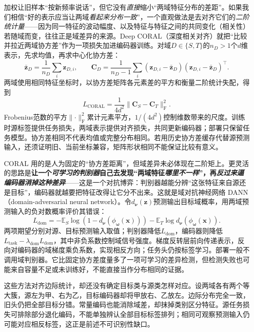 加权让旧样本“按新频率说话”，但它没有\emph{直接}缩小“两域特征分布的差距”。如果我们相信“好的表示应当让两域\emph{看起来分布一致}”，一个直观做法是去对齐它们的\emph{二阶统计量}——因为同一特征的波动幅度、以及特征与特征之间的共同变化（相关性）若随域而变，往往正是域差异的来源。Deep CORAL（深度相关对齐）就把“比较并拉近两域协方差”作为一项损失加进编码器训练。对域$D\in\{S,T\}$的$n_D>1$个$d$维表示，先求均值，再求中心化协方差：
\[
\bar{\bm z}_D=\frac1{n_D}\sum_i\bm z_{D,i},\qquad
\bm C_D=\frac1{n_D-1}\sum_i
(\bm z_{D,i}-\bar{\bm z}_D)(\bm z_{D,i}-\bar{\bm z}_D)^\top.
\]
两域使用相同特征坐标时，以协方差矩阵各元素差的平方和衡量二阶统计失配，得到
\begin{equation}
L_{\mathrm{CORAL}}=\frac1{4d^2}\lVert\bm C_S-\bm C_T\rVert_{\mathrm F}^2.
\label{eq:ket-update-coral}
\end{equation}
Frobenius范数的平方$\lVert\cdot\rVert_{\mathrm F}^2$累计元素平方，$1/(4d^2)$控制维数带来的尺度。训练时源标签提供任务损失，两域表示提供对齐损失，共同更新编码器；部署只保留任务模型。协方差相同不代表均值或完整分布相同。若用历史协方差缓存代替源预测输入，还须证明旧、当前坐标兼容，矩阵形状相同不能保证比较有意义。

CORAL 用的是人为固定的“协方差距离”，但域差异未必体现在二阶矩上。更灵活的思路是\textbf{让一个\emph{可学习的判别器}自己去发现“两域特征\emph{哪里不一样}”，再\emph{反过来逼编码器消掉这种差异}}——这是一个对抗博弈：判别器越能分辨“这张特征来自源还是目标”，编码器就越要把特征改得让它分不出来。这就是域对抗神经网络 DANN（domain-adversarial neural network）。令$d_{\bm{\nu}}(\bm z)$预测输出目标域概率，用两域预测输入的负对数概率评价其错误：
\[
L_{\mathrm{dom}}
=-\mathbb E_S\log(1-d_{\bm{\nu}}(\phi_{\bm{\omega}}(\bm x)))
 -\mathbb E_T\log d_{\bm{\nu}}(\phi_{\bm{\omega}}(\bm x)).
\]
两项期望分别对源、目标预测输入取值；判别器降低$L_{\mathrm{dom}}$，编码器则降低$L_{\mathrm{task}}-\lambda_{\mathrm{dom}}L_{\mathrm{dom}}$，其中非负系数控制域信号强度。梯度反转层前向传递表示，反向对编码器的域梯度乘负系数，实现相反方向；任务头仍按标签学习。部署一般不调用域判别器。它比固定协方差度量多了一项可学习的差异检测，但检测失败也可能来自容量不足或未训练好，不能直接当作分布相同的证据。

这些方法对齐边际统计，却还没有确定目标类与源类怎样对应。设两域各有两个等大簇，源左为甲、右为乙，目标编码器却将甲放右、乙放左。边际分布完全一致，旧头仍把全部目标分错。常量编码也能消除域差，却抹掉类别区分特征。源任务损失可排除部分退化编码，不能单独辨认全部目标标签排列；相同可观察预测输入仍可能对应相反标签，这正是前述不可识别性缺口。

